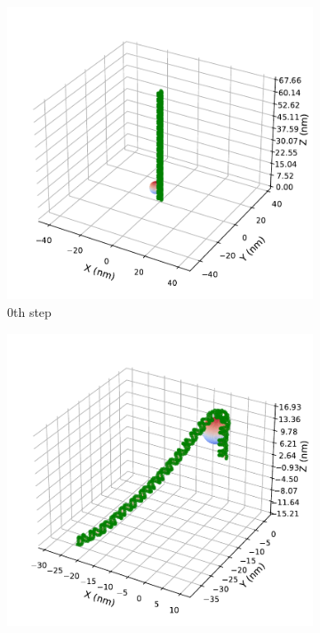 \documentclass[a4paper,10pt]{article}
\begin{document}
\begin{figure}[tb]
\centering
\begin{subfigure}{.3\textwidth}
\includegraphics[width=\textwidth]{hist_0.pdf}
\caption{0th step}
\label{fig:hist_a}
\end{subfigure}
\begin{subfigure}{.3\textwidth}
\includegraphics[width=\textwidth]{hist_100000.pdf}

\end{subfigure}
\end{figure}
\end{document}
